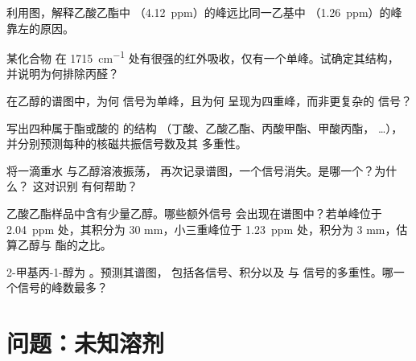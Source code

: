 \begin{exercise}[$\star\star$]\label{exo:g12:proton-nmr:9}
利用图，解释乙酸乙酯中 
（\qty{4.12}{ppm}）的峰远比同一乙基中
（\qty{1.26}{ppm}）的峰靠左的原因。
\end{exercise}

\begin{exercise}[$\star\star$]\label{exo:g12:proton-nmr:10}
某化合物  在
\qty{1715}{cm^{-1}} 处有很强的红外吸收，仅有一个单峰。试确定其结构，
并说明为何排除丙醛？
\end{exercise}

\begin{exercise}[$\star\star$]\label{exo:g12:proton-nmr:11}
在乙醇的谱图中，为何  信号为单峰，且为何
 呈现为四重峰，而非更复杂的
信号？
\end{exercise}

\begin{exercise}[$\star\star\star$]\label{exo:g12:proton-nmr:12}
写出四种属于酯或酸的  的结构
（丁酸、乙酸乙酯、丙酸甲酯、甲酸丙酯，
\dots），并分别预测每种的核磁共振信号数及其
多重性。
\end{exercise}

\begin{exercise}[$\star\star\star$]\label{exo:g12:proton-nmr:13}
将一滴重水  与乙醇溶液振荡，
再次记录谱图，一个信号消失。是哪一个？为什么？
这对识别  有何帮助？
\end{exercise}

\begin{exercise}[$\star\star\star$]\label{exo:g12:proton-nmr:14}
乙酸乙酯样品中含有少量乙醇。哪些额外信号
会出现在谱图中？若单峰位于
\qty{2.04}{ppm} 处，其积分为 30 mm，小三重峰位于
\qty{1.23}{ppm} 处，积分为 3 mm，估算乙醇与
酯的之比。
\end{exercise}

\begin{exercise}[$\star\star\star$]\label{exo:g12:proton-nmr:15}
2-甲基丙-1-醇为 。预测其谱图，
包括各信号、积分以及  与
 信号的多重性。哪一个信号的峰数最多？
\end{exercise}

\section{问题：未知溶剂}

